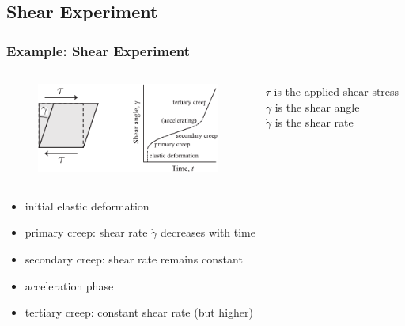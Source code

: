 \documentclass[hide notes,intlimits]{beamer}
\begin{document}
\subsection{Shear Experiment}

\begin{frame}
  \frametitle{Example: Shear Experiment}
  \begin{columns}
    \column[c]{8cm}
    \begin{figure}
      \includegraphics[width=6cm]{figures/fig_4_04}
    \end{figure}
    \column[c]{5cm}
    $\tau$ is the applied shear stress\\
    $\gamma$ is the shear angle\\
    $\dot\gamma$ is the shear rate
  \end{columns}
  \begin{itemize}
    \item initial elastic deformation
    \item primary creep: shear rate $\dot\gamma$ decreases with time
    \item \alert{secondary creep}: shear rate remains constant
    \item acceleration phase
    \item tertiary creep: constant shear rate (but higher) 
 \end{itemize}
\end{frame}


\end{document}

